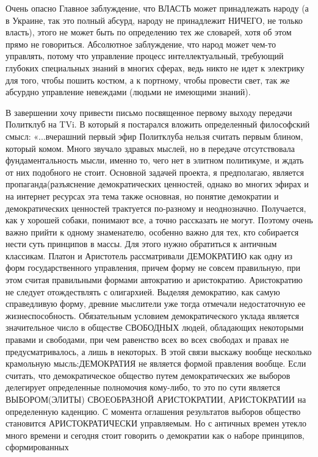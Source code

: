 Очень опасно Главное заблуждение, что ВЛАСТЬ может принадлежать народу (а в
Украине, так это полный абсурд, народу не принадлежит НИЧЕГО, не только
власть), этого не может быть по определению тех же словарей, хотя об этом
прямо не говориться. Абсолютное заблуждение, что народ может чем-то
управлять, потому что управление процесс интеллектуальный, требующий
глубоких специальных знаний в многих сферах, ведь никто не идет к
электрику для того, чтобы пошить костюм, а к портному, чтобы провести
свет, так же абсурдно управление невеждами (людьми не имеющими знаний). 

В завершении хочу привести письмо посвященное первому выходу передачи
Политклуб на TVi. В который я постарался вложить определенный философский
смысл: «...вчерашний первый эфир Политклуба нельзя считать первым
блином, который комом. Много звучало здравых мыслей, но в передаче
отсутствовала фундаментальность мысли, именно то, чего нет в элитном
политикуме, и ждать от них подобного не стоит. Основной задачей проекта, я
предполагаю, является пропаганда(разъяснение демократических ценностей, однако
во многих эфирах и на интернет ресурсах эта тема также основная, но понятие
демократии и демократических ценностей трактуется по-разному и
неоднозначно. Получается, как у хорошей собаки, понимают все, а точно рассказать
не могут. Поэтому очень важно прийти к одному знаменателю, особенно важно для
тех, кто собирается нести суть принципов в массы. Для этого нужно обратиться к
античным классикам. Платон и Аристотель рассматривали ДЕМОКРАТИЮ как одну из
форм государственного управления, причем форму не совсем правильную, при этом
считая правильными формами автократию и аристократию. Аристократию не следует
отождествлять с олигархией. Выделяя демократию, как самую справедливую форму,
древние мыслители уже тогда отмечали недостаточную ее
жизнеспособность. Обязательным условием демократического уклада является
значительное число в обществе СВОБОДНЫХ людей, обладающих некоторыми правами и
свободами, при чем равенство всех во всех свободах и правах не
предусматривалось, а лишь в некоторых. В этой связи выскажу вообще несколько
крамольную мысль:ДЕМОКРАТИЯ не является формой правления вообще. Если
считать, что демократическое общество путем демократических же выборов
делегирует определенные полномочия кому-либо, то это по сути является
ВЫБОРОМ(ЭЛИТЫ) СВОЕОБРАЗНОЙ АРИСТОКРАТИИ, АРИСТОКРАТИИ на определенную
каденцию. С момента оглашения результатов выборов общество становится
АРИСТОКРАТИЧЕСКИ управляемым. Но с античных времен утекло много времени и
сегодня стоит говорить о демократии как о наборе принципов, сформированных
